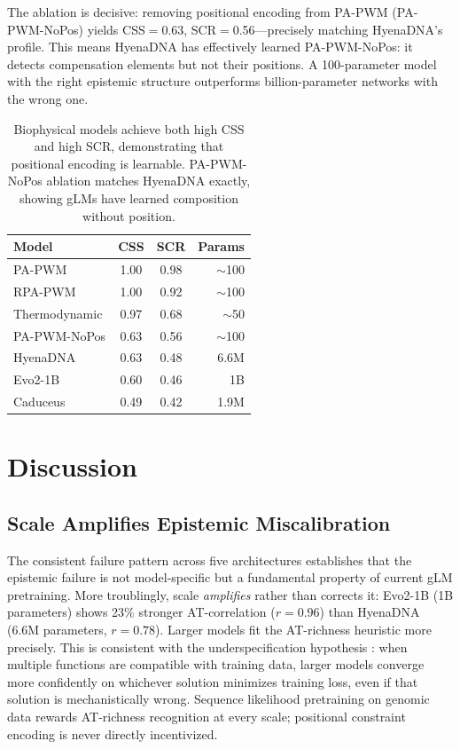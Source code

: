 \documentclass{article}
\begin{document}
The ablation is decisive: removing positional encoding from PA-PWM
(PA-PWM-NoPos) yields CSS$=$0.63, SCR$=$0.56---precisely matching
HyenaDNA's profile.
This means HyenaDNA has effectively learned PA-PWM-NoPos:
it detects compensation elements but not their positions.
A 100-parameter model with the right epistemic structure outperforms
billion-parameter networks with the wrong one.

\begin{table}[t]
\caption{Biophysical models achieve both high CSS and high SCR,
         demonstrating that positional encoding is learnable.
         PA-PWM-NoPos ablation matches HyenaDNA exactly, showing gLMs
         have learned composition without position.}
\label{tab:biophysical}
\vskip 0.05in
\centering
\small
\begin{tabular}{@{}lccr@{}}
\toprule
Model             & CSS  & SCR  & Params \\
\midrule
PA-PWM            & 1.00 & 0.98 & $\sim$100 \\
RPA-PWM           & 1.00 & 0.92 & $\sim$100 \\
Thermodynamic     & 0.97 & 0.68 & $\sim$50  \\
\midrule
PA-PWM-NoPos      & 0.63 & 0.56 & $\sim$100 \\
\midrule
HyenaDNA          & 0.63 & 0.48 & 6.6M \\
Evo2-1B           & 0.60 & 0.46 & 1B   \\
Caduceus          & 0.49 & 0.42 & 1.9M \\
\bottomrule
\end{tabular}
\vskip -0.05in
\end{table}

\section{Discussion}
\label{sec:discussion}

\subsection{Scale Amplifies Epistemic Miscalibration}

The consistent failure pattern across five architectures establishes that
the epistemic failure is not model-specific but a fundamental property of
current gLM pretraining.
More troublingly, scale \emph{amplifies} rather than corrects it:
Evo2-1B (1B parameters) shows 23\% stronger AT-correlation
($r{=}0.96$) than HyenaDNA (6.6M parameters, $r{=}0.78$).
Larger models fit the AT-richness heuristic more precisely.
This is consistent with the underspecification hypothesis
\citep{d2020underspecification}: when multiple functions are compatible
with training data, larger models converge more confidently on whichever
solution minimizes training loss, even if that solution is mechanistically
wrong.
Sequence likelihood pretraining on genomic data rewards AT-richness
recognition at every scale; positional constraint encoding is never
directly incentivized.
\end{document}
